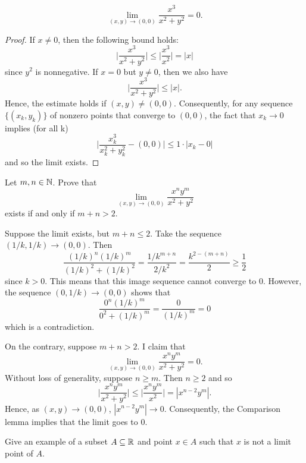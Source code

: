 \documentclass[letterpaper, twoside, 12pt]{book}
\begin{document}
\begin{example}[13.5]
  \[
    \lim_{(x,y)\to(0,0)}\frac{x^3}{x^2+y^2}
      =
    0
  .\]
\end{example}

\begin{proof}
    If \(x \neq 0\), then the following bound holds:
    \[ \bigg| \frac{x^3}{x^2 + y^2} \bigg| \leq \bigg| \frac{x^3}{x^2} \bigg| = |x| \]
    since \(y^2\) is nonnegative. If \(x = 0\) but \(y \neq 0\), then we also have
    \[ \bigg| \frac{x^3}{x^2 + y^2} \bigg| \leq |x| .\]
    Hence, the estimate holds if \((x, y) \neq (0, 0)\). Consequently, for any
    sequence \(\{(x_k, y_k)\}\) of nonzero points that converge to \((0,0)\), the
    fact that \(x_k \to 0\) implies (for all k)  
    \[ \bigg| \frac{x_k^3}{x_k^2 + y_k^2} - (0,0) \bigg| \leq 1 \cdot |x_k - 0| \]
    and so the limit exists.
\end{proof}

\begin{exercise}[4]
  Let \(m,n\in\mathbb N\). Prove that
  \[
    \lim_{(x,y)\to(0,0)}\frac{x^ny^m}{x^2+y^2}
  \]
  exists if and only if \(m+n>2\).
\end{exercise}

\begin{solution}
    Suppose the limit exists, but \(m + n \leq 2\). Take the sequence 
    \((1/k, 1/k) \to (0,0)\). Then  
    \[ \frac{ (1/k)^n (1/k)^m}{ (1/k)^2 + (1/k)^2} = 
       \frac{1/k^{m + n}}{ 2 / k^2} = 
       \frac{k^{2 - (m + n)}}{2} \geq \frac{1}{2}\]
    since \(k > 0\). This means that this image sequence cannot converge
    to \(0\). However, the sequence \((0, 1/k) \to (0,0)\) shows that
    \[ \frac{0^n (1/k)^m}{0^2 + (1/k)^m} = \frac{0}{(1/k)^m} = 0 \]
    which is a contradiction.

    On the contrary, suppose \(m + n > 2\). I claim that
    \[ \lim_{(x,y) \to (0,0)} \frac{x^n y^m}{x^2 + y^2}  = 0 .\]
    Without loss of generality, suppose \(n \geq m\). Then \(n \geq 2\) and so
    \[ \bigg| \frac{x^n y^m}{x^2 + y^2} \bigg| \leq 
       \bigg| \frac{x^n y^m}{x^2} \bigg| =
       | x^{n - 2} y^{m} | .\]
    Hence, as \((x, y) \to (0,0)\), \( |x^{n-2}y^m| \to 0\). Consequently,
    the Comparison lemma implies that the limit goes to \(0\).
\end{solution}

\begin{exercise}[5]
  Give an example of a subset \(A\subseteq\mathbb R\) and point \(x\in A\)
  such that \(x\) is not a limit point of \(A\).
\end{exercise}
\end{document}
